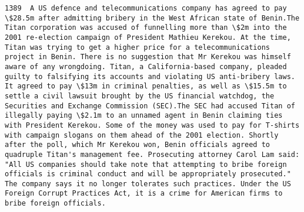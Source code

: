 \documentclass[11pt]{article}
\begin{document}
\begin{Verbatim}[commandchars=\\\{\}]
         1389  A US defence and telecommunications company has agreed to pay \$28.5m after admitting bribery in the West African state of Benin.The Titan corporation was accused of funnelling more than \$2m into the 2001 re-election campaign of President Mathieu Kerekou. At the time, Titan was trying to get a higher price for a telecommunications project in Benin. There is no suggestion that Mr Kerekou was himself aware of any wrongdoing. Titan, a California-based company, pleaded guilty to falsifying its accounts and violating US anti-bribery laws. It agreed to pay \$13m in criminal penalties, as well as \$15.5m to settle a civil lawsuit brought by the US financial watchdog, the Securities and Exchange Commission (SEC).The SEC had accused Titan of illegally paying \$2.1m to an unnamed agent in Benin claiming ties with President Kerekou. Some of the money was used to pay for T-shirts with campaign slogans on them ahead of the 2001 election. Shortly after the poll, which Mr Kerekou won, Benin officials agreed to quadruple Titan's management fee. Prosecuting attorney Carol Lam said: "All US companies should take note that attempting to bribe foreign officials is criminal conduct and will be appropriately prosecuted." The company says it no longer tolerates such practices. Under the US Foreign Corrupt Practices Act, it is a crime for American firms to bribe foreign officials.                                                                                                                                                                                                                                                                                                                                                                                                                                                                                                                                                                                                                                                                                                                                                                                                                                                                                                                                                                                                                                                                                                                                                                                                                                                                                                                                                                                                                                                                                                                                                                                                                                                                                                                                                                                                                                                                                                                                                                               
\end{Verbatim}
\end{document}
